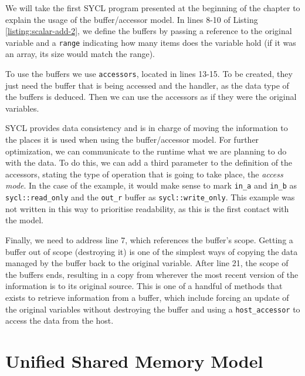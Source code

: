 

We will take the first SYCL program presented at the beginning of the chapter to explain the usage of the buffer/accessor model.
In lines 8-10 of Listing \ref{listing:scalar-add-2}, we define the buffers by passing a reference to the original variable and a \texttt{range} indicating how many items does the variable hold (if it was an array, its size would match the range).

To use the buffers we use \texttt{accessors}, located in lines 13-15.
To be created, they just need the buffer that is being accessed and the handler, as the data type of the buffers is deduced.
Then we can use the accessors as if they were the original variables.

SYCL provides data consistency and is in charge of moving the information to the places it is used when using the buffer/accessor model.
For further optimization, we can communicate to the runtime what we are planning to do with the data.
To do this, we can add a third parameter to the definition of the accessors, stating the type of operation that is going to take place, the \textit{access mode}.
In the case of the example, it would make sense to mark \texttt{in\_a} and \texttt{in\_b} as \texttt{sycl::read\_only} and the \texttt{out\_r} buffer as \texttt{sycl::write\_only}.
This example was not written in this way to prioritise readability, as this is the first contact with the model.

Finally, we need to address line 7, which references the buffer's scope.
Getting a buffer out of scope (destroying it) is one of the simplest ways of copying the data managed by the buffer back to the original variable.
After line 21, the scope of the buffers ends, resulting in a copy from wherever the most recent version of the information is to its original source.
This is one of a handful of methods that exists to retrieve information from a buffer, which include forcing an update of the original variables without destroying the buffer and using a \texttt{host\_accessor} to access the data from the host.

\section{Unified Shared Memory Model}

